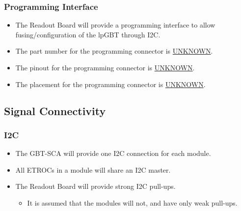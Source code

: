 \documentclass[11pt]{article}
\begin{document}
\subsubsection{Programming Interface}
\label{sec:org9ab1d34}
\begin{itemize}
\item The Readout Board will provide a programming interface to allow fusing/configuration of the lpGBT through I2C.
\item The part number for the programming connector is \uline{UNKNOWN}.
\item The pinout for the programming connector is \uline{UNKNOWN}.
\item The placement for the programming connector is \uline{UNKNOWN}.
\end{itemize}
\subsection{Signal Connectivity}
\label{sec:orgcccd837}
\subsubsection{I2C}
\label{sec:orge6811eb}
\begin{itemize}
\item The GBT-SCA will provide one I2C connection for each module.
\item All ETROCs in a module will share an I2C master.
\item The Readout Board will provide strong I2C pull-ups.
\begin{itemize}
\item It is assumed that the modules will not, and have only weak pull-ups.
\end{itemize}
\end{itemize}
\end{document}
